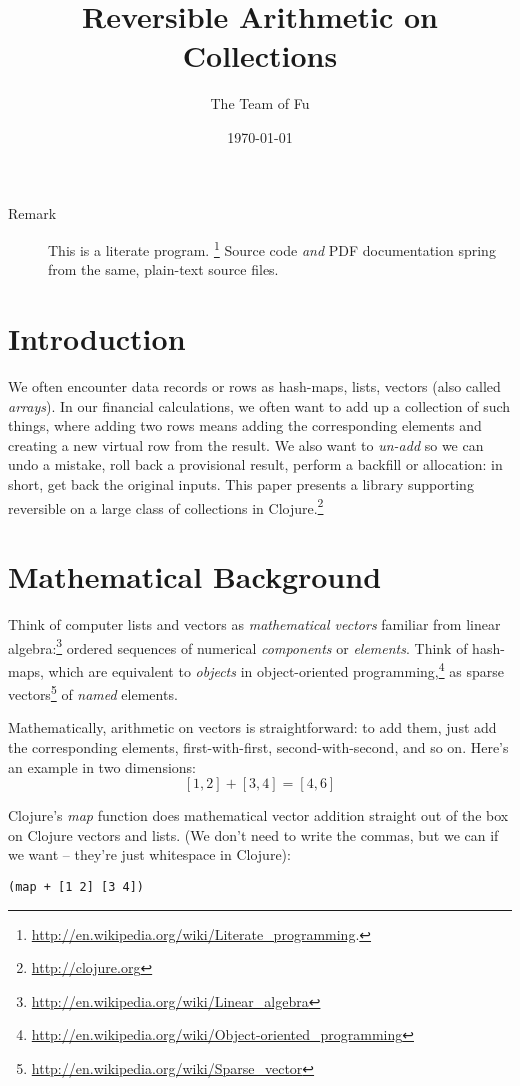 \documentclass[11pt]{article}
\author{The Team of Fu}
\date{\today}
\title{Reversible Arithmetic on Collections}
\begin{document}
\maketitle
\tableofcontents


\begin{description}
\item[{Remark}] This is a literate program.
\footnote{\url{http://en.wikipedia.org/wiki/Literate_programming}.}
Source code \emph{and} PDF documentation spring
from the same, plain-text source files.
\end{description}

\section{Introduction}
\label{sec-1}

We often encounter data records or rows as hash-maps, lists, vectors
(also called \emph{arrays}). In our financial calculations, we often want
to add up a collection of such things, where adding two rows means
adding the corresponding elements and creating a new virtual row from
the result. We also want to \emph{un-add} so we can undo a mistake, roll
back a provisional result, perform a backfill or allocation: in short,
get back the original inputs. This paper presents a library supporting
reversible on a large class of collections in
Clojure.\footnote{\url{http://clojure.org}}
\section{Mathematical Background}
\label{sec-2}

Think of computer lists and vectors as \emph{mathematical vectors} familiar
from linear algebra:\footnote{\url{http://en.wikipedia.org/wiki/Linear_algebra}}
ordered sequences of numerical \emph{components} or \emph{elements}. Think of
hash-maps, which are equivalent to \emph{objects} in object-oriented
programming,\footnote{\url{http://en.wikipedia.org/wiki/Object-oriented_programming}}
as sparse vectors\footnote{\url{http://en.wikipedia.org/wiki/Sparse_vector}} of
\emph{named} elements.

Mathematically, arithmetic on vectors is straightforward: to add
them, just add the corresponding elements, first-with-first,
second-with-second, and so on.  Here's an example in two dimensions:
$$[1, 2] + [3, 4] = [4, 6]$$

Clojure's \emph{map} function does mathematical vector addition straight
out of the box on Clojure vectors and lists.  (We don't need to write
the commas, but we can if we want -- they're just whitespace in
Clojure):
\begin{verbatim}
(map + [1 2] [3 4])
\end{verbatim}
\end{document}
